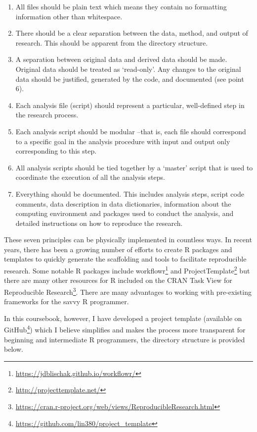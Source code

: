 \documentclass[
]{article}
\DeclareRobustCommand{\href}[2]{#2\footnote{\url{#1}}}
\providecommand{\tightlist}{%
  \setlength{\itemsep}{0pt}\setlength{\parskip}{0pt}}
\begin{document}
\begin{enumerate}
\def\labelenumi{\arabic{enumi}.}
\tightlist
\item
  All files should be plain text which means they contain no formatting information other than whitespace.
\item
  There should be a clear separation between the data, method, and output of research. This should be apparent from the directory structure.
\item
  A separation between original data and derived data should be made. Original data should be treated as `read-only'. Any changes to the original data should be justified, generated by the code, and documented (see point 6).
\item
  Each analysis file (script) should represent a particular, well-defined step in the research process.
\item
  Each analysis script should be modular --that is, each file should correspond to a specific goal in the analysis procedure with input and output only corresponding to this step.
\item
  All analysis scripts should be tied together by a `master' script that is used to coordinate the execution of all the analysis steps.
\item
  Everything should be documented. This includes analysis steps, script code comments, data description in data dictionaries, information about the computing environment and packages used to conduct the analysis, and detailed instructions on how to reproduce the research.
\end{enumerate}

These seven principles can be physically implemented in countless ways. In recent years, there has been a growing number of efforts to create R packages and templates to quickly generate the scaffolding and tools to facilitate reproducible research. Some notable R packages include \href{https://jdblischak.github.io/workflowr/}{workflowr} and \href{http://projecttemplate.net/}{ProjectTemplate} but there are many other resources for R included on the \href{https://cran.r-project.org/web/views/ReproducibleResearch.html}{CRAN Task View for Reproducible Research}. There are many advantages to working with pre-existing frameworks for the savvy R programmer.

In this coursebook, however, I have developed a project template (\href{https://github.com/lin380/project_template}{available on GitHub}) which I believe simplifies and makes the process more transparent for beginning and intermediate R programmers, the directory structure is provided below.
\end{document}
